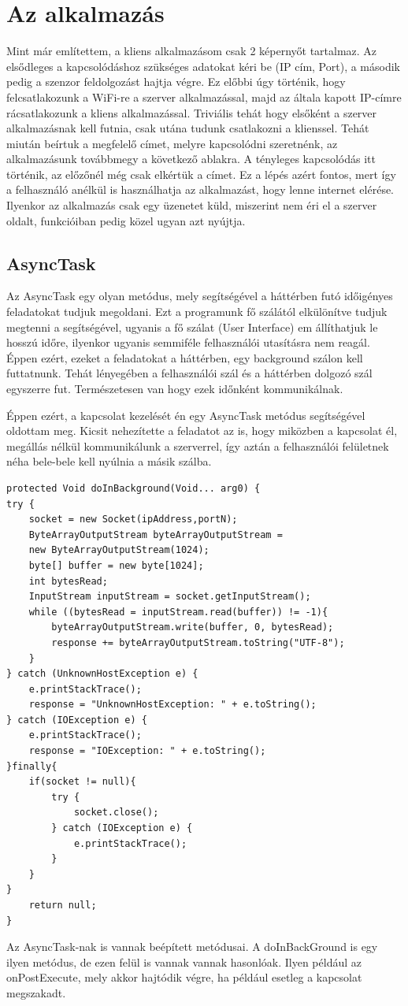 \documentclass{thesis-ekf}
\theoremstyle{definition}
\theoremstyle{remark}
\begin{document}
\section{Az alkalmazás}
Mint már említettem, a kliens alkalmazásom csak 2 képernyőt tartalmaz. Az elsődleges a kapcsolódáshoz szükséges adatokat kéri be (IP cím, Port), a második pedig a szenzor feldolgozást hajtja végre. Ez előbbi úgy történik, hogy felcsatlakozunk a WiFi-re a szerver alkalmazással, majd az általa kapott IP-címre rácsatlakozunk a kliens alkalmazással. Triviális tehát hogy elsőként a szerver alkalmazásnak kell futnia, csak utána tudunk csatlakozni a klienssel. Tehát miután beírtuk a megfelelő címet, melyre kapcsolódni szeretnénk, az alkalmazásunk továbbmegy a következő ablakra. A tényleges kapcsolódás itt történik, az előzőnél még csak elkértük a címet. Ez a lépés azért fontos, mert így a felhasználó anélkül is használhatja az alkalmazást, hogy lenne internet elérése. Ilyenkor az alkalmazás csak egy üzenetet küld, miszerint nem éri el a szerver oldalt, funkcióiban pedig közel ugyan azt nyújtja.
\subsection{AsyncTask}
Az AsyncTask egy olyan metódus, mely segítségével a háttérben futó időigényes feladatokat tudjuk megoldani. Ezt a programunk fő szálától elkülönítve tudjuk megtenni a segítségével, ugyanis a fő szálat (User Interface) em állíthatjuk le hosszú időre, ilyenkor ugyanis semmiféle felhasználói utasításra nem reagál. Éppen ezért, ezeket a feladatokat a háttérben, egy background szálon kell futtatnunk. Tehát lényegében a felhasználói szál és a háttérben dolgozó szál egyszerre fut. Természetesen van hogy ezek időnként kommunikálnak. 
\par Éppen ezért, a kapcsolat kezelését én egy AsyncTask metódus segítségével oldottam meg. Kicsit nehezítette a feladatot az is, hogy miközben a kapcsolat él, megállás nélkül kommunikálunk a szerverrel, így aztán a felhasználói felületnek néha bele-bele kell nyúlnia a másik szálba.
\begin{lstlisting}
protected Void doInBackground(Void... arg0) {
try {
    socket = new Socket(ipAddress,portN);
    ByteArrayOutputStream byteArrayOutputStream =
    new ByteArrayOutputStream(1024);
    byte[] buffer = new byte[1024];
    int bytesRead;
    InputStream inputStream = socket.getInputStream();
    while ((bytesRead = inputStream.read(buffer)) != -1){
        byteArrayOutputStream.write(buffer, 0, bytesRead);
        response += byteArrayOutputStream.toString("UTF-8");
    }
} catch (UnknownHostException e) {
    e.printStackTrace();
    response = "UnknownHostException: " + e.toString();
} catch (IOException e) {
    e.printStackTrace();
    response = "IOException: " + e.toString();
}finally{
    if(socket != null){
        try {
            socket.close();
        } catch (IOException e) {
            e.printStackTrace();
        }
    }
}
    return null;
}
\end{lstlisting}
\par Az AsyncTask-nak is vannak beépített metódusai. A doInBackGround is egy ilyen metódus, de ezen felül is vannak vannak hasonlóak. Ilyen például az onPostExecute, mely akkor hajtódik végre, ha például esetleg a kapcsolat megszakadt.
\end{document}
